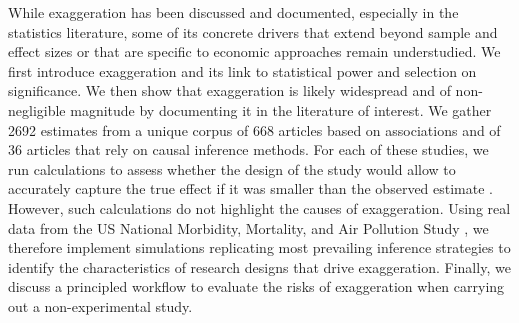 \documentclass[12pt]{article}
\begin{document}
    While exaggeration has been discussed and documented, especially in the statistics literature, some of its concrete drivers that extend beyond sample and effect sizes or that are specific to economic approaches remain understudied. We first introduce exaggeration and its link to statistical power and selection on significance. We then show that exaggeration is likely widespread and of non-negligible magnitude by documenting it in the literature of interest. We gather 2692 estimates from a unique corpus of 668 articles based on associations and of 36 articles that rely on causal inference methods. For each of these studies, we run calculations to assess whether the design of the study would allow to accurately capture the true effect if it was smaller than the observed estimate \citep{gelman_beyond_2014, ioannidis_power_2017, lu_note_2019, timm_retrodesign_2019}. However, such calculations do not highlight the causes of exaggeration. Using real data from the US National Morbidity, Mortality, and Air Pollution Study \citep{samet2000national}, we therefore implement simulations replicating most prevailing inference strategies to identify the characteristics of research designs that drive exaggeration. %
    Finally, we discuss a principled workflow to evaluate the risks of exaggeration when carrying out a non-experimental study.
    
\end{document}
